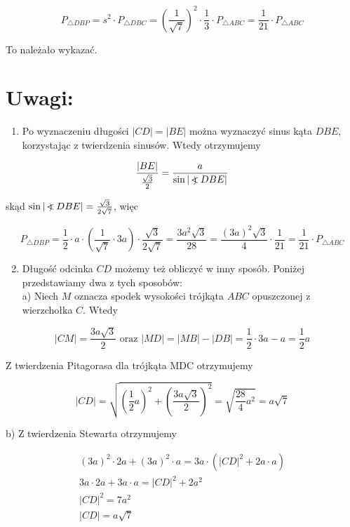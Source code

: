 \documentclass[10pt]{article}
\newcommand\Varangle{\mathop{{<\!\!\!\!\!\text{\small)}}\:}\nolimits}
\begin{document}
$$
P_{\triangle D B P}=s^{2} \cdot P_{\triangle D B C}=\left(\frac{1}{\sqrt{7}}\right)^{2} \cdot \frac{1}{3} \cdot P_{\triangle A B C}=\frac{1}{21} \cdot P_{\triangle A B C}
$$

To należało wykazać.

\section*{Uwagi:}
\begin{enumerate}
  \item Po wyznaczeniu długości $|C D|=|B E|$ można wyznaczyć sinus kąta $D B E$, korzystając z twierdzenia sinusów. Wtedy otrzymujemy
\end{enumerate}

$$
\frac{|B E|}{\frac{\sqrt{3}}{2}}=\frac{a}{\sin |\Varangle D B E|}
$$

skąd $\sin |\Varangle D B E|=\frac{\sqrt{3}}{2 \sqrt{7}}$, więc

$$
P_{\triangle D B P}=\frac{1}{2} \cdot a \cdot\left(\frac{1}{\sqrt{7}} \cdot 3 a\right) \cdot \frac{\sqrt{3}}{2 \sqrt{7}}=\frac{3 a^{2} \sqrt{3}}{28}=\frac{(3 a)^{2} \sqrt{3}}{4} \cdot \frac{1}{21}=\frac{1}{21} \cdot P_{\triangle A B C}
$$

\begin{enumerate}
  \setcounter{enumi}{1}
  \item Długość odcinka $C D$ możemy też obliczyć w inny sposób. Poniżej przedstawiamy dwa z tych sposobów:\\
a) Niech $M$ oznacza spodek wysokości trójkąta $A B C$ opuszczonej z wierzchołka $C$. Wtedy
\end{enumerate}

$$
|C M|=\frac{3 a \sqrt{3}}{2} \text { oraz }|M D|=|M B|-|D B|=\frac{1}{2} \cdot 3 a-a=\frac{1}{2} a
$$

Z twierdzenia Pitagorasa dla trójkąta MDC otrzymujemy

$$
|C D|=\sqrt{\left(\frac{1}{2} a\right)^{2}+\left(\frac{3 a \sqrt{3}}{2}\right)^{2}}=\sqrt{\frac{28}{4} a^{2}}=a \sqrt{7}
$$

b) Z twierdzenia Stewarta otrzymujemy

$$
\begin{gathered}
(3 a)^{2} \cdot 2 a+(3 a)^{2} \cdot a=3 a \cdot\left(|C D|^{2}+2 a \cdot a\right) \\
3 a \cdot 2 a+3 a \cdot a=|C D|^{2}+2 a^{2} \\
|C D|^{2}=7 a^{2} \\
|C D|=a \sqrt{7}
\end{gathered}
$$
\end{document}

